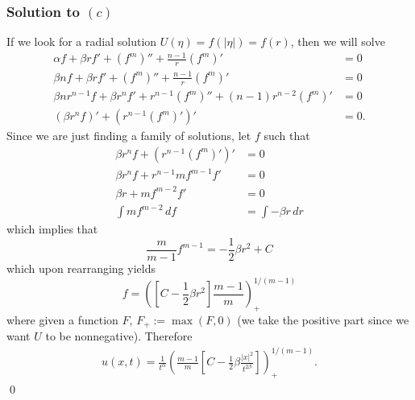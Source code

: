 \subsubsection*{Solution to $(c)$}
If we look for a radial solution $U(\eta) = f(|\eta|) = f(r)$, then we will solve
\begin{align*}
\alpha f + \beta rf' + (f^{m})'' + \frac{n - 1}{r}(f^{m})' &= 0\\
\beta nf + \beta rf' + (f^m)'' + \frac{n - 1}{r}(f^m)' &= 0\\
\beta nr^{n - 1}f + \beta r^{n}f' + r^{n - 1}(f^{m})'' + (n - 1)r^{n - 2}(f^{m})' &= 0\\
(\beta r^{n}f)' + (r^{n - 1}(f^{m})')' &= 0.
\end{align*}
Since we are just finding a family of solutions, let $f$ such that
\begin{align*}
\beta r^{n}f + (r^{n - 1}(f^{m})')' &= 0\\
\beta r^{n}f + r^{n - 1}mf^{m - 1}f' &= 0\\
\beta r + mf^{m - 2}f' &= 0\\
\int mf^{m - 2}\, df &= \int -\beta r\, dr
\end{align*}
which implies that
$$\frac{m}{m - 1}f^{m - 1} = -\frac{1}{2}\beta r^{2} + C$$
which upon rearranging yields
$$f = ([C - \frac{1}{2}\beta r^{2}]\frac{m - 1}{m})_{+}^{1/(m - 1)}$$
where given a function $F$, $F_{+} := \max(F, 0)$ (we take the positive part since we want $U$ to be nonnegative).
Therefore
\begin{align}\label{s078sol}
u(x, t) = \frac{1}{t^{\alpha}}(\frac{m - 1}{m}[C - \frac{1}{2}\beta\frac{|x|^{2}}{t^{2\beta}}])_{+}^{1/(m - 1)}.
\end{align}
\hfill\qed

